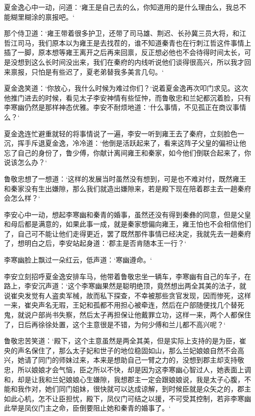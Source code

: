 夏金逸心中一动，问道：‘雍王是自己去的么，你知道用的是什么理由么，我总不能糊里糊涂的禀报吧。‘

那个侍卫道：‘雍王带着很多护卫，还带了司马雄、荆迟、长孙冀三员大将，和江哲江司马，我们原本以为雍王是去找茬的，谁不知道秦青也在行刺江哲这件事情上插了一脚，原本想等雍王离开之后再来回禀，反正想必他也不会待得时间太长，可是没想到这么长时间没出来，我们在秦府的内线听说他们谈得很高兴，所以我才回来禀报，只怕是有些迟了，夏老弟替我多美言几句。‘

夏金逸笑道：‘你放心，我什么时候为难过你们？‘说着夏金逸再次叩门求见。这次他推门进去的时候，看见太子李安神情有些怔忡，而鲁敬忠和兰妃都沉着脸，只有李寒幽仍然是那样神态优雅。李安不耐烦地道：‘什么事情，不见孤正在商议事情么？‘

夏金逸连忙避重就轻的将事情说了一遍，李安一听到雍王去了秦府，立刻脸色一沉，挥手斥退夏金逸，冷冷道：‘他倒是活跃起来了，看来这阵子父皇的偏袒让他忘了自己的身份了，鲁少傅，你献计离间雍王和秦家，如今他们倒联合起来了，你说该怎么办？‘

鲁敬忠想了一想道：‘这样的发展当时虽然没有想到，可是也不难对付，既然雍王和秦家没有生出嫌隙，那么我们就造出嫌隙来，若是殿下现在陪着郡主去一趟秦府会怎么样？‘

李安心中一动，想起李寒幽和秦青的婚事，虽然还没有得到秦彝的同意，但是父皇和母后都是满意的，如果此事一成，就是秦家想偏向雍王，雍王怕也不会相信他们了，自己可不能让他们走得更近，罢了既然那件事情已经决定，我就先去一趟秦府了，想明白之后，李安站起身道：‘郡主是否肯随本王一行？‘

李寒幽脸上飘过一朵红云，低声道：‘寒幽遵命。‘

李安立刻招呼夏金逸安排车马，他带着鲁敬忠坐一辆车，李寒幽有自己的车子，在路上，李安沉声道：‘这个李寒幽果然是聪明绝顶，竟然想出两全其美的法子，就说崔央发觉有人盗卖军械，故而私下探查，不幸被那些贪官发现，因而惨死，这样一来，崔央声名无瑕，王妃和孤都不用担心被牵连，然后在户部随便找几个替死鬼，就说户部尚书失察，然后太子再担保让他戴罪立功，这样一来，两个人都保住了，日后再徐徐处置，这个主意很是不错，为何少傅和兰儿都不高兴呢？‘

鲁敬忠苦笑道：‘殿下，这个主意虽然是两全其美，但是实际上支持的是为臣，崔央的声名保住了，那么太子妃和世子的地位稳固如山，那么兰妃娘娘自然不会高兴，她请了同门的师妹过来，本来是想助自己一臂之力的，没想到郡主却支持敬忠，所以娘娘才会气恼，臣之所以不快，却是因为这李寒幽心智过人，她表面上调和，却是让我和兰妃娘娘心生嫌隙，我想郡主一定会跟娘娘说，我是太子心腹，不能和我作对，她们同门姐妹，很快就可以达成谅解，到时候臣就是众矢之的，郡主如此心机，怎不让臣担忧，殿下，凤仪门可结之以援，不可受其控制，若非李寒幽此举是凤仪门主之命，臣倒要阻止她和秦青的婚事了。‘

